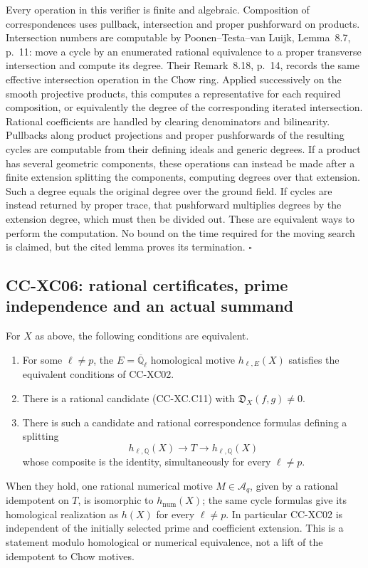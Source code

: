 Every operation in this verifier is finite and algebraic.
Composition of correspondences uses pullback, intersection
and proper pushforward on products.  Intersection numbers
are computable by Poonen--Testa--van Luijk, Lemma~8.7,
p.~11: move a cycle by an enumerated rational equivalence
to a proper transverse intersection and compute its degree.
Their Remark~8.18, p.~14, records the same effective
intersection operation in the Chow ring.  Applied successively
on the smooth projective products, this computes a
representative for each required composition, or equivalently
the degree of the corresponding iterated intersection.
Rational coefficients are handled by clearing denominators
and bilinearity.  Pullbacks along product projections and
proper pushforwards of the resulting cycles are computable
from their defining ideals and generic degrees.
If a product has several geometric components, these
operations can instead be made after a finite extension
splitting the components, computing degrees over that extension.  Such a degree equals
the original degree over the ground field.  If cycles are
instead returned by proper trace, that pushforward multiplies
degrees by the extension degree, which must then be divided
out.  These are equivalent ways to perform the computation.
No bound on the time required for the moving search is
claimed, but the cited lemma proves its termination.
\(\square\)

\subsection{CC-XC06: rational certificates, prime independence and an
actual summand}

For \(X\) as above, the following conditions are equivalent.
\begin{enumerate}
\item For some \(\ell\ne p\), the \(E=\overline{\mathbb Q}_\ell\)
homological motive \(h_{\ell,E}(X)\) satisfies the equivalent
conditions of CC-XC02.
\item There is a rational candidate (CC-XC.C11) with
\(\mathfrak D_X(f,g)\ne0\).
\item There is such a candidate and rational correspondence
formulas defining a splitting
\[
 h_{\ell,\mathbb Q}(X)\longrightarrow T
                  \longrightarrow h_{\ell,\mathbb Q}(X)
 \]
whose composite is the identity, simultaneously for every
\(\ell\ne p\).
\end{enumerate}
When they hold, one rational numerical motive
\(M\in\mathcal A_q\), given by a rational idempotent on \(T\),
is isomorphic to \(h_{\mathrm{num}}(X)\); the same cycle
formulas give its homological realization as \(h(X)\) for
every \(\ell\ne p\).  In particular CC-XC02 is independent
of the initially selected prime and coefficient extension.
This is a statement modulo homological or numerical
equivalence, not a lift of the idempotent to Chow motives.

